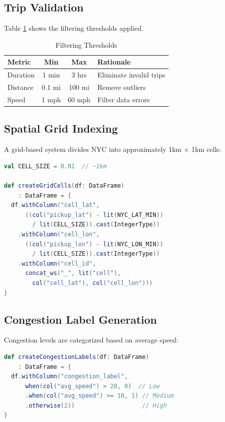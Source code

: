 \documentclass[conference]{IEEEtran}
\begin{document}
\subsection{Trip Validation}

Table \ref{tab:thresholds} shows the filtering thresholds applied.

\begin{table}[htbp]
\caption{Filtering Thresholds}
\begin{center}
\begin{tabular}{|l|c|c|l|}
\hline
\textbf{Metric} & \textbf{Min} & \textbf{Max} & \textbf{Rationale} \\
\hline
Duration & 1 min & 3 hrs & Eliminate invalid trips \\
Distance & 0.1 mi & 100 mi & Remove outliers \\
Speed & 1 mph & 60 mph & Filter data errors \\
\hline
\end{tabular}
\label{tab:thresholds}
\end{center}
\end{table}

\subsection{Spatial Grid Indexing}

A grid-based system divides NYC into approximately 1km $\times$ 1km cells:

\begin{lstlisting}[caption={Grid Cell Creation},language=Scala]
val CELL_SIZE = 0.01  // ~1km

def createGridCells(df: DataFrame)
    : DataFrame = {
  df.withColumn("cell_lat",
      ((col("pickup_lat") - lit(NYC_LAT_MIN)) 
        / lit(CELL_SIZE)).cast(IntegerType))
    .withColumn("cell_lon",
      ((col("pickup_lon") - lit(NYC_LON_MIN)) 
        / lit(CELL_SIZE)).cast(IntegerType))
    .withColumn("cell_id",
      concat_ws("_", lit("cell"), 
        col("cell_lat"), col("cell_lon")))
}
\end{lstlisting}

\subsection{Congestion Label Generation}

Congestion levels are categorized based on average speed:

\begin{lstlisting}[caption={Congestion Labels},language=Scala]
def createCongestionLabels(df: DataFrame)
    : DataFrame = {
  df.withColumn("congestion_label",
      when(col("avg_speed") > 20, 0)  // Low
      .when(col("avg_speed") >= 10, 1) // Medium
      .otherwise(2))                   // High
}
\end{lstlisting}
\end{document}
